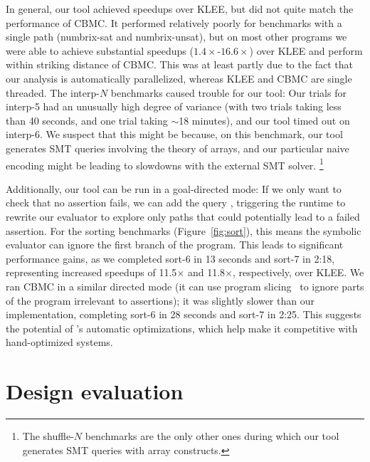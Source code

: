 \documentclass[acmsmall,screen,nonacm]{acmart}
\theoremstyle{definition}
\begin{document}
In general, our tool achieved speedups over KLEE, but did not quite match the
performance of CBMC.
It performed relatively poorly for benchmarks with a single path
(numbrix-sat and numbrix-unsat), but on most other programs we were able to
achieve substantial speedups ($1.4\times$-$16.6\times$) over KLEE and perform
within striking distance of CBMC.
This was at least partly due to the fact that our analysis is automatically
parallelized, whereas KLEE and CBMC are single threaded.
The interp-$N$ benchmarks caused trouble for our tool: Our trials for interp-5
had an unusually high degree of variance (with two trials taking less than 40
seconds, and one trial taking $\sim$18 minutes), and our tool timed out on
interp-6.
We suspect that this might be because, on this benchmark, our tool generates
SMT queries involving the theory of arrays, and our particular naive encoding
might be leading to slowdowns with the external SMT solver.%
\footnote{The shuffle-$N$ benchmarks are the only other ones during which our
tool generates SMT queries with array constructs.}

Additionally, our tool can be run in a goal-directed mode:
If we only want to check that no assertion fails, we can add the query
, triggering the \Name runtime to rewrite our
evaluator to explore only paths that could potentially lead to a failed
assertion.
For the sorting benchmarks (Figure~\ref{fig:sort}), this means the symbolic
evaluator can ignore the first branch of the program.
This leads to significant performance gains, as we completed sort-6 in 13
seconds and sort-7 in 2:18, representing increased speedups of 11.5$\times$ and
11.8$\times$, respectively, over KLEE.
We ran CBMC in a similar directed mode (it can use program
slicing~\citep{slicing} to ignore parts of the program irrelevant to
assertions); it was slightly slower than our \Name implementation, completing
sort-6 in 28 seconds and sort-7 in 2:25.
This suggests the potential of \Name's automatic optimizations, which help make
it competitive with hand-optimized systems.

\section{Design evaluation}\label{sec:eval}
\end{document}
